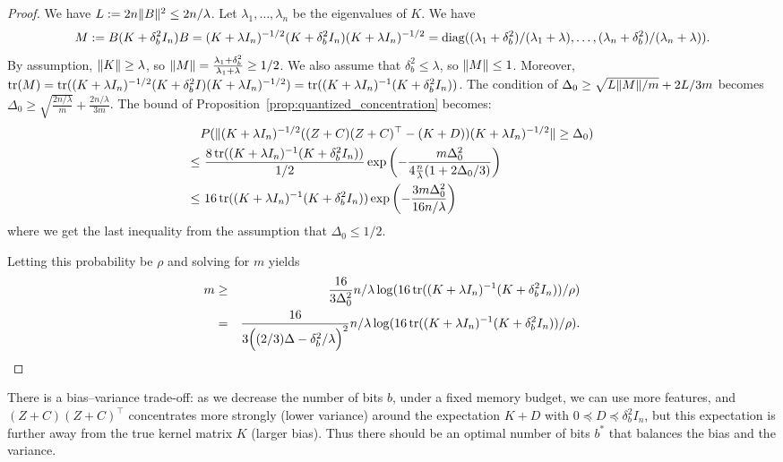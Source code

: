 \begin{proof}
We have $L := 2n \|B\|^2 \leq 2n/\lambda$.
Let $\lambda_1, \dots, \lambda_n$ be the eigenvalues of $K$.
We have
\begin{equation*}
M \defeq B(K + \delta^2_b I_n) B =  (K + \lambda I_n)^{-1/2} (K + \delta^2_b I_n) (K + \lambda
I_n)^{-1/2} = \diag((\lambda_1 + \delta^2_b)/(\lambda_1 + \lambda), \dots,
(\lambda_n + \delta^2_b) / (\lambda_n + \lambda)).
\end{equation*}
By assumption, $\|K\| \geq \lambda$, so $\|M\| = \frac{\lambda_1 + \delta^2_b}{\lambda_1 + \lambda} \geq
1/2$.
We also assume that $\delta^2_b \leq \lambda$, so $\|M\| \leq 1$.
Moreover, $\mathop{\rm tr}(M) = \mathop{\rm tr}((K + \lambda I_n)^{-1/2} (K + \delta^2_b I) (K + \lambda I_n)^{-1/2}) =
\mathop{\rm tr}((K + \lambda I_n)^{-1} (K + \delta^2_b I_n))$.
The condition of $\Delta_0 \geq \sqrt{L \|M\| / m} + 2L/3m$ becomes $\Delta_0 \geq \sqrt{\frac{2n/\lambda}{m}} + \frac{2n/\lambda}{3m}$.
The bound of Proposition~\ref{prop:quantized_concentration} becomes:
\begin{align*}
&P(\|(K + \lambda I_n)^{-1/2} ((Z + C) (Z + C)^\top - (K + D)) (K + \lambda
  I_n)^{-1/2}\| \geq \Delta_0) \\
\leq&\ \frac{8 \mathop{\rm tr}((K + \lambda I_n)^{-1} (K + \delta^2_b I_n))}{1/2} \exp \left( -\frac{m
  \Delta_0^2}{4\frac{n}{\lambda} (1 + 2\Delta_0/3)} \right) \\
\leq&\ 16 \mathop{\rm tr}((K + \lambda I_n)^{-1} (K + \delta^2_b I_n)) \exp \left( -\frac{3m\Delta_0^2}{16n/\lambda} \right)
\end{align*}
where we get the last inequality from the assumption that $\Delta_0 \leq 1/2$.

Letting this probability be $\rho$ and solving for $m$ yields
\begin{eqnarray*}
m &\geq& \frac{16}{3 \Delta_0^2} n/\lambda \log (16 \mathop{\rm tr}((K + \lambda I_n)^{-1} (K + \delta^2_b I_n)) / \rho) \\
&=& \frac{16}{3 \Big((2/3)\Delta - \delta_b^2/\lambda\Big)^2} n/\lambda \log (16 \mathop{\rm tr}((K + \lambda I_n)^{-1} (K + \delta^2_b I_n)) / \rho).
\end{eqnarray*}

\end{proof}

There is a bias--variance trade-off: as we decrease the number of bits $b$, under
a fixed memory budget, we can use more features, and $(Z + C)(Z + C)^\top$
concentrates more strongly (lower variance) around the expectation $K + D$ with
$0 \preceq D \preceq \delta^2_b I_n$, but this expectation is further away from the true kernel
matrix $K$ (larger bias).
Thus there should be an optimal number of bits $b^*$ that balances the bias and
the variance.

